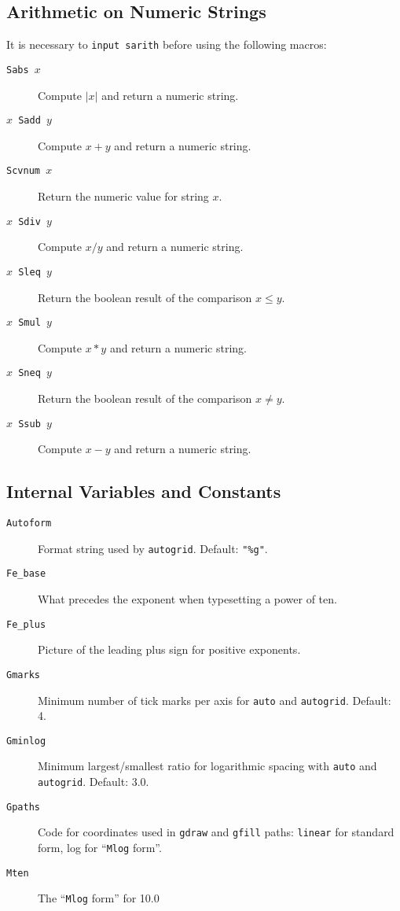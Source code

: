 \documentclass{article} %
\begin{document}
\subsection{Arithmetic on Numeric Strings}

It is necessary to {\tt input sarith} before using the following macros:
\begin{description}
\item[{\tt Sabs $x$}]
        Compute $|x|$ and return a numeric string.
\item[{\tt $x$ Sadd $y$}]
        Compute $x+y$ and return a numeric string.
\item[{\tt Scvnum $x$}]
        Return the numeric value for string $x$.
\item[{\tt $x$ Sdiv $y$}]
        Compute $x/y$ and return a numeric string.
\item[{\tt $x$ Sleq $y$}]
        Return the boolean result of the comparison $x\leq y$.
\item[{\tt $x$ Smul $y$}]
        Compute $x*y$ and return a numeric string.
\item[{\tt $x$ Sneq $y$}]
        Return the boolean result of the comparison $x\neq y$.
\item[{\tt $x$ Ssub $y$}]
        Compute $x-y$ and return a numeric string.
\end{description}

\subsection{Internal Variables and Constants}

\begin{description}
\item[{\tt Autoform}]
        Format string used by {\tt autogrid}.  Default: \verb|"%g"|.
\item[{\tt Fe\_base}]
        What precedes the exponent when typesetting a power of ten.
\item[{\tt Fe\_plus}]
        Picture of the leading plus sign for positive exponents.
\item[{\tt Gmarks}]
        Minimum number of tick marks per axis for {\tt auto} and {\tt autogrid}.
        Default: 4.
\item[{\tt Gminlog}]
        Minimum largest/smallest ratio for logarithmic spacing with {\tt auto}
        and {\tt autogrid}.  Default: 3.0.
\item[{\tt Gpaths}]
        Code for coordinates used in {\tt gdraw} and {\tt gfill} paths:
        {\tt linear} for standard form, {log} for ``{\tt Mlog} form''.
\item[{\tt Mten}]
        The ``{\tt Mlog} form'' for 10.0
\end{description}




\end{document}
